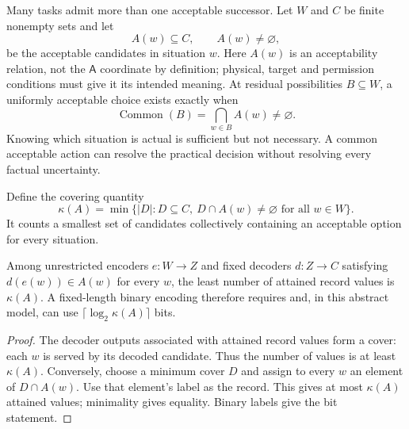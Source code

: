 Many tasks admit more than one acceptable successor. Let \(W\) and \(C\) be finite nonempty sets and let
\begin{equation}
A(w)\subseteq C,\qquad A(w)\ne\varnothing,
\label{eq:acceptance}
\end{equation}
be the acceptable candidates in situation \(w\). Here \(A(w)\) is an acceptability relation, not the \(\mathsf A\) coordinate by definition; physical, target and permission conditions must give it its intended meaning. At residual possibilities \(B\subseteq W\), a uniformly acceptable choice exists exactly when
\begin{equation}
\operatorname{Common}(B)=\bigcap_{w\in B}A(w)\ne\varnothing.
\label{eq:common}
\end{equation}
Knowing which situation is actual is sufficient but not necessary. A common acceptable action can resolve the practical decision without resolving every factual uncertainty.

Define the covering quantity
\begin{equation}
\kappa(A)=\min\bigl\{|D|:D\subseteq C,\ D\cap A(w)\ne\varnothing\text{ for all }w\in W\bigr\}.
\label{eq:cover}
\end{equation}
It counts a smallest set of candidates collectively containing an acceptable option for every situation.

\begin{proposition}
\label{prop:cover}
Among unrestricted encoders \(e:W\to Z\) and fixed decoders \(d:Z\to C\) satisfying \(d(e(w))\in A(w)\) for every \(w\), the least number of attained record values is \(\kappa(A)\). A fixed-length binary encoding therefore requires and, in this abstract model, can use \(\lceil\log_2\kappa(A)\rceil\) bits.
\end{proposition}
\begin{proof}
The decoder outputs associated with attained record values form a cover: each \(w\) is served by its decoded candidate. Thus the number of values is at least \(\kappa(A)\). Conversely, choose a minimum cover \(D\) and assign to every \(w\) an element of \(D\cap A(w)\). Use that element's label as the record. This gives at most \(\kappa(A)\) attained values; minimality gives equality. Binary labels give the bit statement.
\end{proof}

